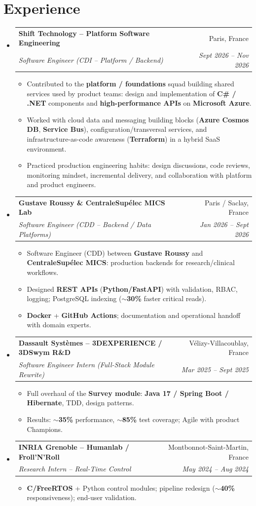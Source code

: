 \documentclass[letterpaper,10.5pt]{article}
\makeatletter
\newcommand{\resumeItem}[1]{\item\small{#1 \vspace{-1.5pt}}}
\newcommand{\resumeSubheading}[4]{\vspace{-1pt}\item\begin{tabular*}{0.97\textwidth}[t]{l@{\extracolsep{\fill}}r}\textbf{#1} & #2 \\\textit{\small#3} & \textit{\small #4} \\\end{tabular*}\vspace{-5pt}}
\newcommand{\resumeSubHeadingListStart}{\begin{itemize}[leftmargin=0.15in, label={}]}
\newcommand{\resumeSubHeadingListEnd}{\end{itemize}}
\newcommand{\resumeItemListStart}{\begin{itemize}[leftmargin=0.18in]}
\newcommand{\resumeItemListEnd}{\end{itemize}\vspace{-3pt}}
\makeatother
\begin{document}
\section{Experience}
\resumeSubHeadingListStart
  \resumeSubheading
    {Shift Technology -- Platform Software Engineering}{Paris, France}
    {Software Engineer (CDI -- Platform / Backend)}{Sept 2026 -- Nov 2026}
    \resumeItemListStart
      \resumeItem{Contributed to the \textbf{platform / foundations} squad building shared services used by product teams: design and implementation of \textbf{C\# / .NET} components and \textbf{high-performance APIs} on \textbf{Microsoft Azure}.}
      \resumeItem{Worked with cloud data and messaging building blocks (\textbf{Azure Cosmos DB}, \textbf{Service Bus}), configuration/transversal services, and infrastructure-as-code awareness (\textbf{Terraform}) in a hybrid SaaS environment.}
      \resumeItem{Practiced production engineering habits: design discussions, code reviews, monitoring mindset, incremental delivery, and collaboration with platform and product engineers.}
    \resumeItemListEnd
  \resumeSubheading
    {Gustave Roussy \& CentraleSup\'elec MICS Lab}{Paris / Saclay, France}
    {Software Engineer (CDD -- Backend / Data Platforms)}{Jan 2026 -- Sept 2026}
    \resumeItemListStart
      \resumeItem{Software Engineer (CDD) between \textbf{Gustave Roussy} and \textbf{CentraleSup\'elec MICS}: production backends for research/clinical workflows.}
      \resumeItem{Designed \textbf{REST APIs} (\textbf{Python/FastAPI}) with validation, RBAC, logging; PostgreSQL indexing (\textbf{$\sim$30\%} faster critical reads).}
      \resumeItem{\textbf{Docker} + \textbf{GitHub Actions}; documentation and operational handoff with domain experts.}
    \resumeItemListEnd
  \resumeSubheading
    {Dassault Syst\`emes -- 3DEXPERIENCE / 3DSwym R\&D}{V\'elizy-Villacoublay, France}
    {Software Engineer Intern (Full-Stack Module Rewrite)}{Mar 2025 -- Sept 2025}
    \resumeItemListStart
      \resumeItem{Full overhaul of the \textbf{Survey module}: \textbf{Java 17 / Spring Boot / Hibernate}, TDD, design patterns.}
      \resumeItem{Results: \textbf{$\sim$35\%} performance, \textbf{$\sim$85\%} test coverage; Agile with product Champions.}
    \resumeItemListEnd
  \resumeSubheading
    {INRIA Grenoble -- Humanlab / Froll'N'Roll}{Montbonnot-Saint-Martin, France}
    {Research Intern -- Real-Time Control}{May 2024 -- Aug 2024}
    \resumeItemListStart
      \resumeItem{\textbf{C/FreeRTOS} + Python control modules; pipeline redesign (\textbf{$\sim$40\%} responsiveness); end-user validation.}
    \resumeItemListEnd
\resumeSubHeadingListEnd
\end{document}
